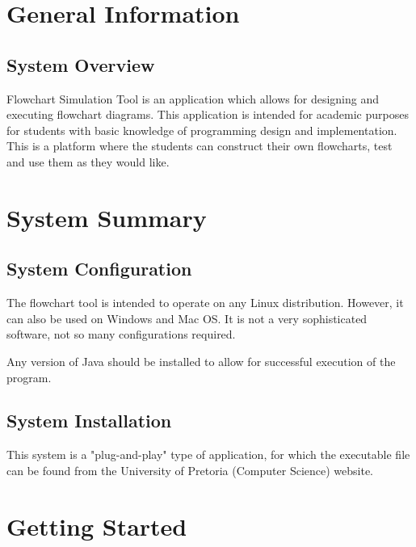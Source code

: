 \documentclass[11pt,a4paper,titlepage]{article}
\begin{document}

\newpage
\tableofcontents
{}
\newpage
{}
\section{General Information}
	\subsection{System Overview}
	
		Flowchart Simulation Tool is an application which allows for 				designing and executing flowchart diagrams. This application is 		intended for academic purposes for students with basic knowledge of 		programming design and implementation. This is a platform where the students can construct their own flowcharts, test and use them as they would like.
	
\section{System Summary}
	\subsection{System Configuration}
		
		The flowchart tool is intended to operate on any Linux 						distribution. However, it can also be used on Windows and 			Mac OS. It is not a very sophisticated software, not so many configurations required.
		
		Any version of Java should be installed to allow for successful execution of the program. 
		
		\subsection{System Installation}
		
		This system is a "plug-and-play" type of application, for which the executable file can be found from the University of Pretoria (Computer Science) website.
		


		
		







\section{Getting Started}
	
\end{document}
